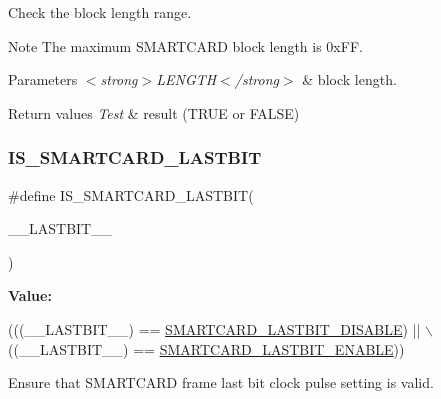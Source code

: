 Check the block length range. 

\begin{DoxyNote}{Note}
The maximum S\+M\+A\+R\+T\+C\+A\+RD block length is 0x\+FF. 
\end{DoxyNote}

\begin{DoxyParams}{Parameters}
{\em $<$strong$>$\+L\+E\+N\+G\+T\+H$<$/strong$>$} & block length. \\
\hline
\end{DoxyParams}

\begin{DoxyRetVals}{Return values}
{\em Test} & result (T\+R\+UE or F\+A\+L\+SE) \\
\hline
\end{DoxyRetVals}
\mbox{\label{group___s_m_a_r_t_c_a_r_d___private___macros_gad5133b1e345f9601e8a2f05fcf8004c0}} 
\subsubsection{\texorpdfstring{I\+S\+\_\+\+S\+M\+A\+R\+T\+C\+A\+R\+D\+\_\+\+L\+A\+S\+T\+B\+IT}{IS\_SMARTCARD\_LASTBIT}}
{\footnotesize\ttfamily \#define I\+S\+\_\+\+S\+M\+A\+R\+T\+C\+A\+R\+D\+\_\+\+L\+A\+S\+T\+B\+IT(\begin{DoxyParamCaption}\item[{}]{\+\_\+\+\_\+\+L\+A\+S\+T\+B\+I\+T\+\_\+\+\_\+ }\end{DoxyParamCaption})}

{\bfseries Value\+:}
\begin{DoxyCode}
(((\_\_LASTBIT\_\_) == \hyperlink{group___s_m_a_r_t_c_a_r_d___last___bit_ga8ce0dd5ed70e0ce9799c9b056363e884}{SMARTCARD\_LASTBIT\_DISABLE}) || \(\backslash\)
                                           ((\_\_LASTBIT\_\_) == 
      \hyperlink{group___s_m_a_r_t_c_a_r_d___last___bit_ga11edb8d6ed3ba95eade9a1a6d35a2468}{SMARTCARD\_LASTBIT\_ENABLE}))
\end{DoxyCode}


Ensure that S\+M\+A\+R\+T\+C\+A\+RD frame last bit clock pulse setting is valid. 


